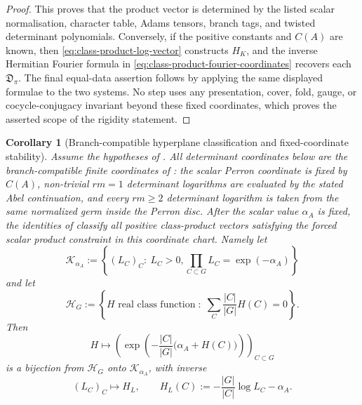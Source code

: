 \documentclass[11pt,a4paper]{amsart}
\theoremstyle{plain}
\newtheorem{corollary}[theorem]{Corollary}
\theoremstyle{definition}
\theoremstyle{remark}
\begin{document}
\begin{proof}
  This proves that the product vector is determined by the listed scalar
  normalisation, character table, Adams tensors, branch tags, and twisted
  determinant polynomials.
  Conversely, if the positive constants and \(C(A)\) are known, then
  \eqref{eq:class-product-log-vector} constructs \(H_K\), and the inverse
  Hermitian Fourier formula in \eqref{eq:class-product-fourier-coordinates}
  recovers each \(\mathfrak D_\pi\).  The final equal-data assertion follows
  by applying the same displayed formulae to the two systems.  No step uses
  any presentation, cover, fold, gauge, or cocycle-conjugacy invariant beyond
  these fixed coordinates, which proves the asserted scope of the rigidity
  statement.
\end{proof}

\begin{corollary}[Branch-compatible hyperplane classification and fixed-coordinate stability]
  \label{cor:class-product-hyperplane-stability}
  \label{cor:class-product-stability-scalar-independence}
  Assume the hypotheses of .  All
  determinant coordinates below are the branch-compatible finite coordinates
  of : the scalar Perron
  coordinate is fixed by \(C(A)\), non-trivial \(rm=1\) determinant
  logarithms are evaluated by the stated Abel continuation, and every
  \(rm\ge2\) determinant logarithm is taken from the same normalized germ
  inside the Perron disc.  After the scalar value \(\alpha_A\) is fixed, the
  identities of  classify all
  positive class-product vectors satisfying the forced scalar product
  constraint in this coordinate chart.  Namely let
  \[
    \mathscr K_{\alpha_A}:=
    \left\{(L_C)_C:\ L_C>0,
      \prod_{C\subset G}L_C=\exp(-\alpha_A)\right\}
  \]
  and let
  \[
    \mathcal H_G:=
    \left\{H\text{ real class function}\;:\;
      \sum_C\frac{|C|}{|G|}H(C)=0\right\}.
  \]
  Then
  \begin{equation}\label{eq:class-product-coordinate-map}
    H\longmapsto
    \left(
      \exp\!\left(-\frac{|C|}{|G|}
        \bigl(\alpha_A+H(C)\bigr)\right)
    \right)_{C\subset G}
  \end{equation}
  is a bijection from \(\mathcal H_G\) onto
  \(\mathscr K_{\alpha_A}\), with inverse
  \begin{equation}\label{eq:class-product-coordinate-map-inverse}
    (L_C)_C\longmapsto H_L,
    \qquad
    H_L(C):=-\frac{|G|}{|C|}\log L_C-\alpha_A .
  \end{equation}

\end{corollary}
\end{document}

